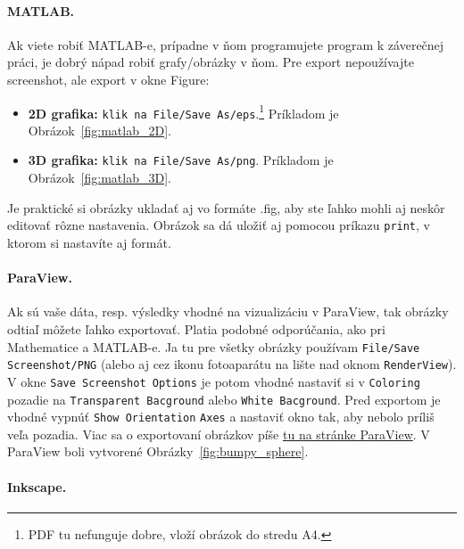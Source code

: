 \paragraph{MATLAB.}

Ak viete robiť MATLAB-e, prípadne v ňom programujete program k záverečnej práci, je dobrý nápad robiť grafy/obrázky v ňom. Pre export nepoužívajte screenshot, ale export v okne Figure:
\begin{itemize}
	\item \textbf{2D grafika:} \verb|klik na File/Save As/eps|.\footnote{PDF tu nefunguje dobre, vloží obrázok do stredu A4.} Príkladom je Obrázok~\ref{fig:matlab_2D}.
	\item \textbf{3D grafika:} \verb|klik na File/Save As/png|. Príkladom je Obrázok~\ref{fig:matlab_3D}.
\end{itemize}
Je praktické si obrázky ukladať aj vo formáte .fig, aby ste ľahko mohli aj neskôr editovať rôzne nastavenia. Obrázok sa dá uložiť aj pomocou príkazu \verb|print|, v ktorom si nastavíte aj formát.


\paragraph{ParaView.}

Ak sú vaše dáta, resp. výsledky vhodné na vizualizáciu v ParaView, tak obrázky odtiaľ môžete ľahko exportovať. Platia podobné odporúčania, ako pri Mathematice a MATLAB-e. Ja tu pre všetky obrázky používam \verb|File/Save Screenshot/PNG| (alebo aj cez ikonu fotoaparátu na lište nad oknom \verb|RenderView|). V okne \verb|Save Screenshot Options| je potom vhodné nastaviť si v \verb|Coloring| pozadie na \verb|Transparent Bacground| alebo \verb|White Bacground|. Pred exportom je vhodné vypnúť \verb|Show Orientation| \verb|Axes| a nastaviť okno tak, aby nebolo príliš veľa pozadia. 
Viac sa o exportovaní obrázkov píše \href{https://docs.paraview.org/en/v5.8/UsersGuide/savingResults.html}{tu na stránke ParaView}. V ParaView boli vytvorené Obrázky~\ref{fig:bumpy_sphere}.


\paragraph{Inkscape.}

